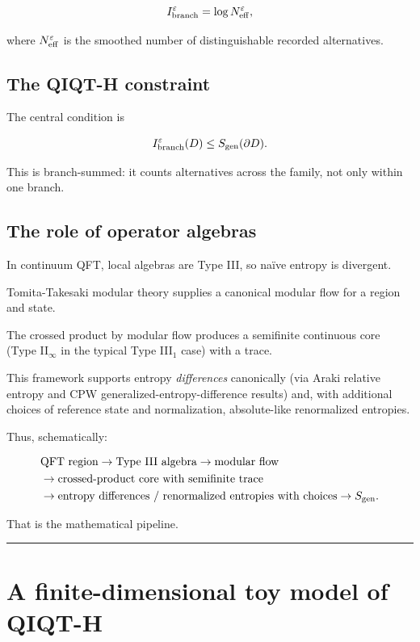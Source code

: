 \documentclass[11pt,a4paper]{article}
\begin{document}
\[
I_{\rm branch}^{\varepsilon}
=
\log N_{\rm eff}^{\varepsilon},
\]

where $N_{\rm eff}^{\varepsilon}$ is the smoothed number of distinguishable recorded alternatives.

\subsection{The QIQT-H constraint}

The central condition is

\[
I_{\rm branch}^{\varepsilon}(D)
\leq
S_{\rm gen}(\partial D).
\]

This is branch-summed: it counts alternatives across the family, not only within one branch.

\subsection{The role of operator algebras}

In continuum QFT, local algebras are Type III, so naïve entropy is divergent.

Tomita-Takesaki modular theory supplies a canonical modular flow for a region and state.

The crossed product by modular flow produces a semifinite continuous core (Type II$_\infty$ in the typical Type III$_1$ case) with a trace.

This framework supports entropy \emph{differences} canonically (via Araki relative entropy and CPW generalized-entropy-difference results) and, with additional choices of reference state and normalization, absolute-like renormalized entropies.

Thus, schematically:

\[
\begin{aligned}
&\text{QFT region} \rightarrow \text{Type III algebra} \rightarrow \text{modular flow} \\
&\rightarrow \text{crossed-product core with semifinite trace} \\
&\rightarrow \text{entropy differences / renormalized entropies with choices} \rightarrow S_{\rm gen}.
\end{aligned}
\]

That is the mathematical pipeline.

\medskip\hrule\medskip

\section{A finite-dimensional toy model of QIQT-H}
\end{document}
